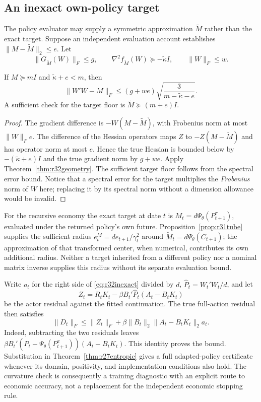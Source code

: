 \subsection{An inexact own-policy target}
The policy evaluator may supply a symmetric approximation $\widetilde M$ rather
than the exact target. Suppose an independent evaluation account establishes
$\|M-\widetilde M\|_2\leq e$. Let
\[
 \|G_{\widetilde M}(W)\|_F\leq g,\qquad
 \nabla^2 f_{\widetilde M}(W)\succeq-\widetilde\kappa I,
 \qquad \|W\|_F\leq w.
\]

\begin{corollary}\label{cor:r32inexact}
If $M\succeq mI$ and $\widetilde\kappa+e<m$, then
\begin{equation}\label{eq:r32inexact}
 \|W'W-M\|_F\leq
 (g+we)\sqrt{\frac{3}{m-\widetilde\kappa-e}}.
\end{equation}
A sufficient check for the target floor is
$\widetilde M\succeq(m+e)I$.
\end{corollary}
\begin{proof}
The gradient difference is $-W(M-\widetilde M)$, with Frobenius norm at most
$\|W\|_F e$. The difference of the Hessian operators maps $Z$ to
$-Z(M-\widetilde M)$ and has operator norm at most $e$. Hence the true
Hessian is bounded below by $-(\widetilde\kappa+e)I$ and the true gradient
norm by $g+we$. Apply Theorem~\ref{thm:r32geometry}. The sufficient target
floor follows from the spectral error bound. Notice that a spectral error
for the target multiplies the \emph{Frobenius} norm of $W$ here; replacing
it by its spectral norm without a dimension allowance would be invalid.
\end{proof}

For the recursive economy the exact target at date $t$ is
$M_t=d\Psi_\theta(P_{t+1}^{\pi})$, evaluated under the returned policy's
own future. Proposition~\ref{prop:r31tube} supplies the sufficient radius
$e_t^{M}=d e_{t+1}/\gamma_t^2$ around
$\widetilde M_t=d\Psi_\theta(C_{t+1})$; the approximation of that transformed
center, when numerical, contributes its own additional radius.
Neither a target inherited from a different policy nor a nominal matrix
inverse supplies this radius without its separate evaluation bound.

Write $a_t$ for the right side of \eqref{eq:r32inexact} divided by $d$,
$\widehat P_t=W_t'W_t/d$, and let
\[
 Z_t=R_tK_t-\beta B_t'\widehat P_t(A_t-B_tK_t)
\]
be the actor residual against the fitted continuation. The true full-action
residual then satisfies
\begin{equation}\label{eq:r32actor}
 \|D_t\|_F\leq\|Z_t\|_F+
   \beta\|B_t\|_2\|A_t-B_tK_t\|_2 a_t.
\end{equation}
Indeed, subtracting the two residuals leaves
$\beta B_t'(\widehat P_t-\Psi_\theta(P_{t+1}^{\pi}))
(A_t-B_tK_t)$. This identity proves the bound. Substitution in
Theorem~\ref{thm:r27entropic} gives a full adapted-policy certificate whenever
its domain, positivity, and implementation conditions also hold. The curvature
check is consequently a training diagnostic with an explicit route to economic
accuracy, not a replacement for the independent economic stopping rule.

